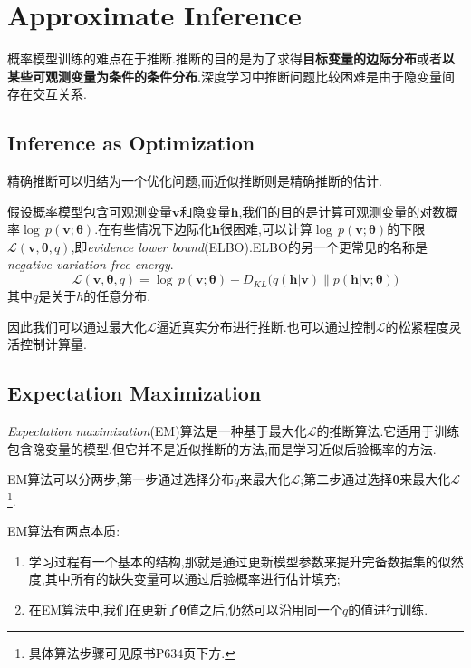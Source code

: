 \chapter{Approximate Inference}

概率模型训练的难点在于推断.推断的目的是为了求得\textbf{目标变量的边际分布}或者\textbf{以某些可观测变量为条件的条件分布}.深度学习中推断问题比较困难是由于隐变量间存在交互关系.

\section{Inference as Optimization}

精确推断可以归结为一个优化问题,而近似推断则是精确推断的估计.

假设概率模型包含可观测变量$\bm v$和隐变量$\bm h$,我们的目的是计算可观测变量的对数概率$\log\,p(\bm v;\bm\theta)$.在有些情况下边际化$\bm h$很困难,可以计算$\log\,p(\bm v;\bm\theta)$的下限$\mathcal L(\bm v,\bm\theta,q)$,即\textit{evidence lower bound}(ELBO).ELBO的另一个更常见的名称是\textit{negative variation free energy}.
\begin{equation}
\mathcal L(\bm v,\bm\theta,q)=\log\,p(\bm v;\bm\theta)-D_{KL}\Big(q(\bm{h|v})\big\|p(\bm{h|v;\theta})\Big)
\end{equation}
其中$q$是关于$h$的任意分布.

因此我们可以通过最大化$\mathcal L$逼近真实分布进行推断.也可以通过控制$\mathcal L$的松紧程度灵活控制计算量.

\section{Expectation Maximization}

\textit{Expectation maximization}(EM)算法是一种基于最大化$\mathcal L$的推断算法.它适用于训练包含隐变量的模型.但它并不是近似推断的方法,而是学习近似后验概率的方法.

EM算法可以分两步,第一步通过选择分布$q$来最大化$\mathcal L$;第二步通过选择$\bm\theta$来最大化$\mathcal L$\footnote{具体算法步骤可见原书P$634$页下方.}.

EM算法有两点本质:
\begin{enumerate}
    \item 学习过程有一个基本的结构,那就是通过更新模型参数来提升完备数据集的似然度,其中所有的缺失变量可以通过后验概率进行估计填充;
    \item 在EM算法中,我们在更新了$\bm\theta$值之后,仍然可以沿用同一个$q$的值进行训练.
\end{enumerate}

